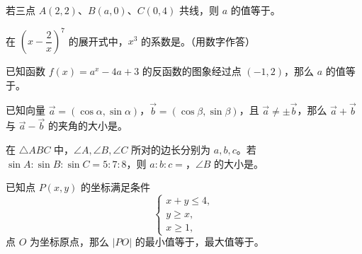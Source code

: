 \begin{question}
若三点 $A(2,2)$、$B(a,0)$、$C(0,4)$ 共线，则 $a$ 的值等于\gkblank{}。

\end{question}
\begin{question}
在 $\left(x-\dfrac2x\right)^7$ 的展开式中，$x^3$ 的系数是\gkblank{}。（用数字作答）

\end{question}
\begin{question}
已知函数 $f(x)=a^x-4a+3$ 的反函数的图象经过点 $(-1,2)$，那么 $a$ 的值等于\gkblank{}。

\end{question}
\begin{question}
已知向量 $\vec a=(\cos\alpha,\sin\alpha)$，$\vec b=(\cos\beta,\sin\beta)$，且 $\vec a\ne\pm\vec b$，那么 $\vec a+\vec b$ 与 $\vec a-\vec b$ 的夹角的大小是\gkblank{}。

\end{question}
\begin{question}
在 $\triangle ABC$ 中，$\angle A,\angle B,\angle C$ 所对的边长分别为 $a,b,c$。若 $\sin A:\sin B:\sin C=5:7:8$，则 $a:b:c=$\gkblank{}，$\angle B$ 的大小是\gkblank{}。

\end{question}
\begin{question}
已知点 $P(x,y)$ 的坐标满足条件
\nopagebreak[4]
\[
\begin{cases}
x+y\le 4,\\
y\ge x,\\
x\ge 1,
\end{cases}
\]
点 $O$ 为坐标原点，那么 $|PO|$ 的最小值等于\gkblank{}，最大值等于\gkblank{}。

\end{question}

